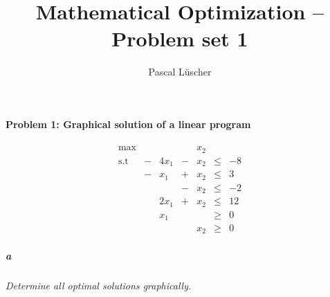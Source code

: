 \documentclass[12pt, a4]{article}
\author{Pascal Lüscher}
\title{Mathematical Optimization – Problem set 1}
\begin{document}
\paragraph{Problem 1: Graphical solution of a linear program}

\begin{equation*}
	\begin{array}{lcrcrcr}
		\text{max} &  &  &  & x_2 &  & \\
		\text{s.t} & - & 4x_1 & - & x_2 & \leq & -8\\
		& - & x_1 & + & x_2 & \leq & 3\\
		&&& - & x_2 & \leq & -2 \\
		&& 2 x_1 & + & x_2 & \leq & 12 \\
		&& x_1 &&&\geq&0\\
		&& &&x_2&\geq&0
	\end{array}
\end{equation*}

\newcommand{\lightgray}{black!30}
\newcommand{\addPlotLDown}[1]{
	\addplot[mark=none, domain=-1:9, color=\lightgray,
		decoration={border,segment length=1mm,amplitude=1.5mm,angle=-135},
		postaction={decorate}
	] {#1};
	\addplot[mark=none, domain=-1:9] {#1};
}
\newcommand{\addPlotRUp}[1]{
	\addplot[mark=none, domain=-1:9, color=\lightgray,
		decoration={border,segment length=1mm,amplitude=1.5mm,angle=135},
		postaction={decorate}
	] {#1};
	\addplot[mark=none, domain=-1:9] {#1};
}

\subparagraph{a}\label{pg:a} \textit{Determine all optimal solutions graphically.}

\begin{figure}[ht]
	\centering
\end{figure}
\end{document}
